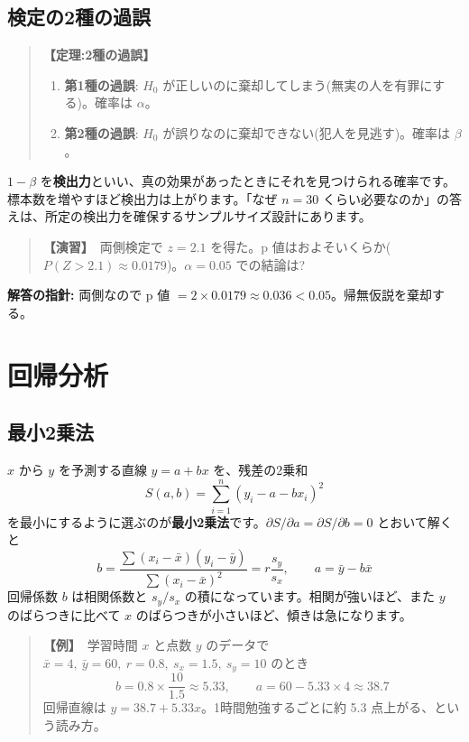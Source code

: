 \documentclass{article}
\begin{document}
\subsection{検定の2種の過誤}

\begin{quote}
\textbf{【定理:2種の過誤】}
\begin{enumerate}
\item \textbf{第1種の過誤}: \(H_0\) が正しいのに棄却してしまう(無実の人を有罪にする)。確率は \(\alpha\)。
\item \textbf{第2種の過誤}: \(H_0\) が誤りなのに棄却できない(犯人を見逃す)。確率は \(\beta\)。
\end{enumerate}
\end{quote}

\(1 - \beta\) を\textbf{検出力}といい、真の効果があったときにそれを見つけられる確率です。標本数を増やすほど検出力は上がります。「なぜ \(n = 30\) くらい必要なのか」の答えは、所定の検出力を確保するサンプルサイズ設計にあります。

\begin{quote}
\textbf{【演習】}\ 両側検定で \(z = 2.1\) を得た。p 値はおよそいくらか(\(P(Z > 2.1) \approx 0.0179\))。\(\alpha = 0.05\) での結論は?
\end{quote}

\textbf{解答の指針:} 両側なので p 値 \(= 2 \times 0.0179 \approx 0.036 < 0.05\)。帰無仮説を棄却する。

\section{回帰分析}

\subsection{最小2乗法}

\(x\) から \(y\) を予測する直線 \(y = a + bx\) を、残差の2乗和
\[ S(a, b) = \sum_{i=1}^{n} (y_i - a - b x_i)^2 \]
を最小にするように選ぶのが\textbf{最小2乗法}です。\(\partial S / \partial a = \partial S / \partial b = 0\) とおいて解くと
\[ b = \frac{\sum (x_i - \bar{x})(y_i - \bar{y})}{\sum (x_i - \bar{x})^2} = r \frac{s_y}{s_x}, \qquad a = \bar{y} - b \bar{x} \]
回帰係数 \(b\) は相関係数と \(s_y / s_x\) の積になっています。相関が強いほど、また \(y\) のばらつきに比べて \(x\) のばらつきが小さいほど、傾きは急になります。

\begin{quote}
\textbf{【例】}\ 学習時間 \(x\) と点数 \(y\) のデータで \(\bar{x} = 4,\ \bar{y} = 60,\ r = 0.8,\ s_x = 1.5,\ s_y = 10\) のとき
\[ b = 0.8 \times \frac{10}{1.5} \approx 5.33, \qquad a = 60 - 5.33 \times 4 \approx 38.7 \]
回帰直線は \(y = 38.7 + 5.33 x\)。1時間勉強するごとに約 5.3 点上がる、という読み方。
\end{quote}
\end{document}
